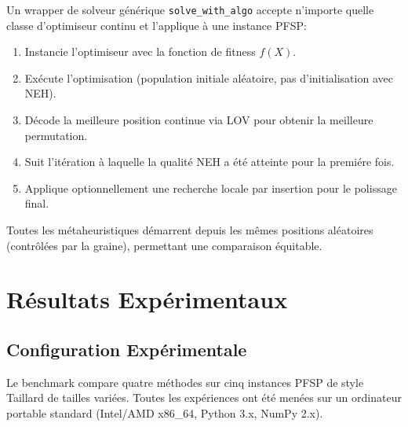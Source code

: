 \documentclass[12pt,a4paper,oneside]{report}
\begin{document}
Un wrapper de solveur g\'en\'erique \texttt{solve\_with\_algo} accepte n'importe quelle classe d'optimiseur continu et l'applique \`a une instance PFSP:

\begin{enumerate}[itemsep=2pt]
    \item Instancie l'optimiseur avec la fonction de fitness $f(X)$.
    \item Ex\'ecute l'optimisation (population initiale al\'eatoire, pas d'initialisation avec NEH).
    \item D\'ecode la meilleure position continue via LOV pour obtenir la meilleure permutation.
    \item Suit l'it\'eration \`a laquelle la qualit\'e NEH a \'et\'e atteinte pour la premi\'ere fois.
    \item Applique optionnellement une recherche locale par insertion pour le polissage final.
\end{enumerate}

Toutes les m\'etaheuristiques d\'emarrent depuis les m\^emes positions al\'eatoires (contr\^ol\'ees par la graine), permettant une comparaison \'equitable.

\clearpage

\chapter{R\'esultats Exp\'erimentaux}

\section{Configuration Exp\'erimentale}

Le benchmark compare quatre m\'ethodes sur cinq instances PFSP de style Taillard de tailles vari\'ees. Toutes les exp\'eriences ont \'et\'e men\'ees sur un ordinateur portable standard (Intel/AMD x86\_64, Python 3.x, NumPy 2.x).
\end{document}
